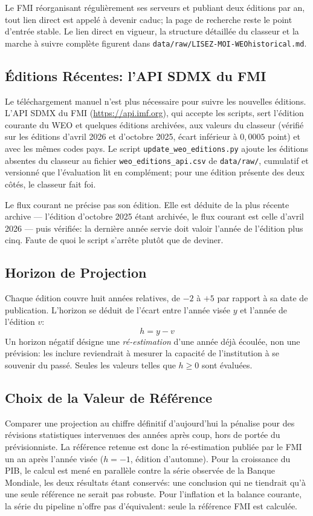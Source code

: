 \documentclass[11pt,a4paper]{article}
\begin{document}
Le FMI réorganisant régulièrement ses serveurs et publiant deux éditions par an, tout lien direct est appelé à devenir caduc; la page de recherche reste le point d'entrée stable. Le lien direct en vigueur, la structure détaillée du classeur et la marche à suivre complète figurent dans \texttt{data/raw/LISEZ-MOI-WEOhistorical.md}.

\subsection{Éditions Récentes: l'API SDMX du FMI}
Le téléchargement manuel n'est plus nécessaire pour suivre les nouvelles éditions. L'API SDMX du FMI (\url{https://api.imf.org}), qui accepte les scripts, sert l'édition courante du WEO et quelques éditions archivées, aux valeurs du classeur (vérifié sur les éditions d'avril 2026 et d'octobre 2025, écart inférieur à $0{,}0005$ point) et avec les mêmes codes pays. Le script \texttt{update\_weo\_editions.py} ajoute les éditions absentes du classeur au fichier \texttt{weo\_editions\_api.csv} de \texttt{data/raw/}, cumulatif et versionné que l'évaluation lit en complément; pour une édition présente des deux côtés, le classeur fait foi.

Le flux courant ne précise pas son édition. Elle est déduite de la plus récente archive --- l'édition d'octobre 2025 étant archivée, le flux courant est celle d'avril 2026 --- puis vérifiée: la dernière année servie doit valoir l'année de l'édition plus cinq. Faute de quoi le script s'arrête plutôt que de deviner.

\subsection{Horizon de Projection}
Chaque édition couvre huit années relatives, de $-2$ à $+5$ par rapport à sa date de publication. L'horizon se déduit de l'écart entre l'année visée $y$ et l'année de l'édition $v$:
\begin{equation}
h = y - v
\end{equation}
Un horizon négatif désigne une \emph{ré-estimation} d'une année déjà écoulée, non une prévision: les inclure reviendrait à mesurer la capacité de l'institution à se souvenir du passé. Seules les valeurs telles que $h \geq 0$ sont évaluées.

\subsection{Choix de la Valeur de Référence}
Comparer une projection au chiffre définitif d'aujourd'hui la pénalise pour des révisions statistiques intervenues des années après coup, hors de portée du prévisionniste. La référence retenue est donc la ré-estimation publiée par le FMI un an après l'année visée ($h = -1$, édition d'automne). Pour la croissance du PIB, le calcul est mené en parallèle contre la série observée de la Banque Mondiale, les deux résultats étant conservés: une conclusion qui ne tiendrait qu'à une seule référence ne serait pas robuste. Pour l'inflation et la balance courante, la série du pipeline n'offre pas d'équivalent: seule la référence FMI est calculée.
\end{document}

